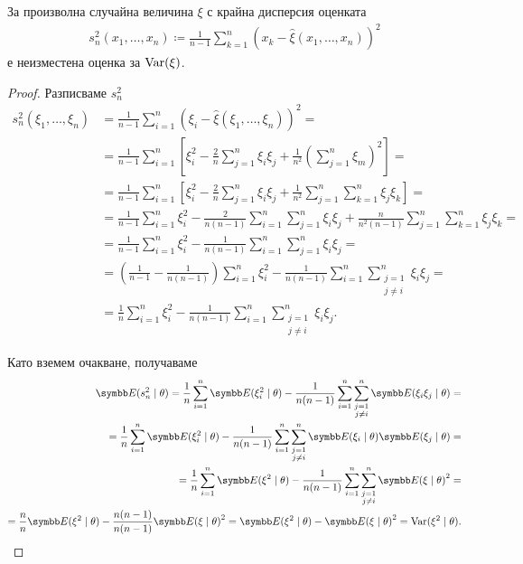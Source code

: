 \documentclass[numbers=endperiod, bibliography=totocnumbered]{scrartcl}
\begin{document}
\begin{proposition}\label{thm:corrected_variation_is_unbiased_estimator}
  За произволна случайна величина \( \xi \) с крайна дисперсия оценката
  \begin{align*}
    s_n^2(x_1, \ldots, x_n) \coloneqq \frac 1 {n-1} \sum_{k=1}^n {(x_k - \hat \xi(x_1, \ldots, x_n))}^2
  \end{align*}
  е неизместена оценка за \( \operatorname{Var}(\xi) \).
\end{proposition}
\begin{proof}
  Разписваме \( s_n^2 \)
  \begingroup
  \allowdisplaybreaks
  \begin{align*}
    s_n^2(\xi_1, \ldots, \xi_n)
    &=
    \frac 1 {n-1} \sum_{i=1}^n {(\xi_i - \hat \xi(\xi_1, \ldots, \xi_n))}^2
    = \\ &=
    \frac 1 {n-1} \sum_{i=1}^n \left[\xi_i^2 - \frac 2 n \sum_{j=1}^n \xi_i \xi_j + \frac 1 {n^2} {\left( \sum_{j=1}^n \xi_m \right)}^2 \right]
    = \\ &=
    \frac 1 {n-1} \sum_{i=1}^n \left[\xi_i^2 - \frac 2 n \sum_{j=1}^n \xi_i \xi_j + \frac 1 {n^2} \sum_{j=1}^n \sum_{k=1}^n \xi_j \xi_k \right]
    = \\ &=
    \frac 1 {n-1} \sum_{i=1}^n \xi_i^2 - \frac 2 {n(n-1)} \sum_{i=1}^n \sum_{j=1}^n \xi_i \xi_j + \frac n {n^2 (n-1)} \sum_{j=1}^n \sum_{k=1}^n \xi_j \xi_k
    = \\ &=
    \frac 1 {n-1} \sum_{i=1}^n \xi_i^2 - \frac 1 {n(n-1)} \sum_{i=1}^n \sum_{j=1}^n \xi_i \xi_j
    = \\ &=
    \left(\frac 1 {n-1} - \frac 1 {n(n-1)} \right) \sum_{i=1}^n \xi_i^2 - \frac 1 {n(n-1)} \sum_{i=1}^n \sum_{\substack{j=1 \\ j\neq i}}^n \xi_i \xi_j
    = \\ &=
    \frac 1 n \sum_{i=1}^n \xi_i^2 - \frac 1 {n(n-1)} \sum_{i=1}^n \sum_{\substack{j=1 \\ j\neq i}}^n \xi_i \xi_j.
  \end{align*}
  \endgroup

  Като вземем очакване, получаваме
  \begin{align*}
    \Expect(s_n^2 \mid \theta)
    =
    \frac 1 n \sum_{i=1}^n \Expect(\xi_i^2 \mid \theta) - \frac 1 {n(n-1)} \sum_{i=1}^n \sum_{\substack{j=1 \\ j\neq i}}^n \Expect(\xi_i \xi_j \mid \theta)
    = \\ =
    \frac 1 n \sum_{i=1}^n \Expect(\xi_i^2 \mid \theta) - \frac 1 {n(n-1)} \sum_{i=1}^n \sum_{\substack{j=1 \\ j\neq i}}^n \Expect(\xi_i \mid \theta) \Expect(\xi_j \mid \theta)
    = \\ =
    \frac 1 n \sum_{i=1}^n \Expect(\xi^2 \mid \theta) - \frac 1 {n(n-1)} \sum_{i=1}^n \sum_{\substack{j=1 \\ j\neq i}}^n {\Expect(\xi \mid \theta)}^2
    = \\ =
    \frac n n \Expect(\xi^2 \mid \theta) - \frac {n(n-1)} {n(n-1)} {\Expect(\xi \mid \theta)}^2
    =
    \Expect(\xi^2 \mid \theta) - {\Expect(\xi \mid \theta)}^2
    =
    \Var(\xi^2 \mid \theta).
  \end{align*}
\end{proof}
\end{document}
